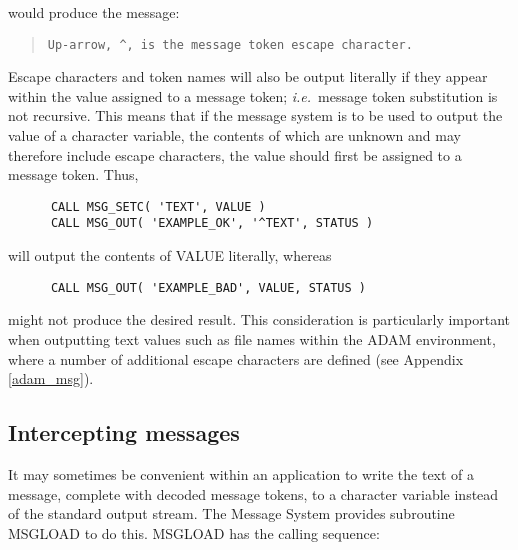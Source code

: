 \documentclass[twoside,11pt]{article}
\newcommand{\htmlref}[2]{#1}
\newcommand{\latex}[1]{#1}
\newcommand{\xlabel}[1]{}
\renewcommand{\_}{\texttt{\symbol{95}}}
\begin{document}
would produce the message:

\begin {quote}
\begin {small}
\begin{verbatim}
Up-arrow, ^, is the message token escape character.
\end{verbatim}
\end {small}
\end {quote}

Escape characters and token names will also be output literally if they 
appear within the value assigned to a message token; \textit{i.e.}\ message token 
substitution is not recursive.
This means that if the message system is to be used to output the value of a 
character variable, the contents of which are unknown and may therefore 
include escape characters, the value should first be assigned to a message 
token.
Thus,

\begin {small}
\begin {verbatim}
      CALL MSG_SETC( 'TEXT', VALUE )
      CALL MSG_OUT( 'EXAMPLE_OK', '^TEXT', STATUS )
\end{verbatim}
\end {small}

will output the contents of VALUE literally, whereas

\begin {small}
\begin{verbatim}
      CALL MSG_OUT( 'EXAMPLE_BAD', VALUE, STATUS )
\end{verbatim}
\end {small}

might not produce the desired result.
This consideration is particularly important when outputting text values 
such as file names 
\htmlref{within the ADAM environment}{adam_msg},
where a number of additional escape characters are 
defined\latex{ (see Appendix \ref{adam_msg})}.


\subsection{\xlabel{intercepting_messages}Intercepting messages \label{inter_sect}}

It may sometimes be convenient within an application to write the text of a 
message, complete with decoded message tokens, to a character variable 
instead of the standard output stream.
The Message System provides subroutine MSG\_LOAD to do this.
MSG\_LOAD has the calling sequence:
\end{document}
